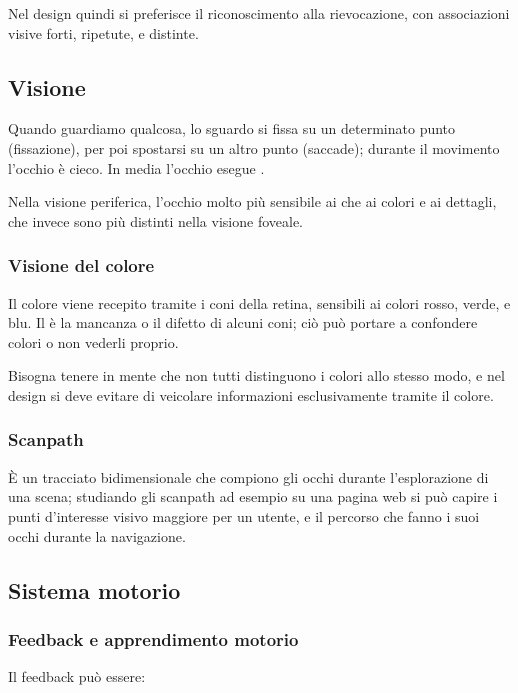 Nel design quindi si preferisce il riconoscimento alla rievocazione, con associazioni visive forti, ripetute, e distinte.

\subsection{Visione}

Quando guardiamo qualcosa, lo sguardo si fissa su un determinato punto (fissazione), per poi spostarsi su un altro punto (saccade); durante il movimento l'occhio è cieco. In media l'occhio esegue .

Nella visione periferica, l'occhio molto più sensibile ai  che ai colori e ai dettagli, che invece sono più distinti nella visione foveale.

\subsubsection{Visione del colore}

Il colore viene recepito tramite i coni della retina, sensibili ai colori rosso, verde, e blu. Il  è la mancanza o il difetto di alcuni coni; ciò può portare a confondere colori o non vederli proprio.

Bisogna tenere in mente che non tutti distinguono i colori allo stesso modo, e nel design si deve evitare di veicolare informazioni esclusivamente tramite il colore.

\subsubsection{Scanpath}

È un tracciato bidimensionale che compiono gli occhi durante l'esplorazione di una scena; studiando gli scanpath ad esempio su una pagina web si può capire i punti d'interesse visivo maggiore per un utente, e il percorso che fanno i suoi occhi durante la navigazione.

\subsection{Sistema motorio}

\subsubsection{Feedback e apprendimento motorio}

Il feedback può essere:

